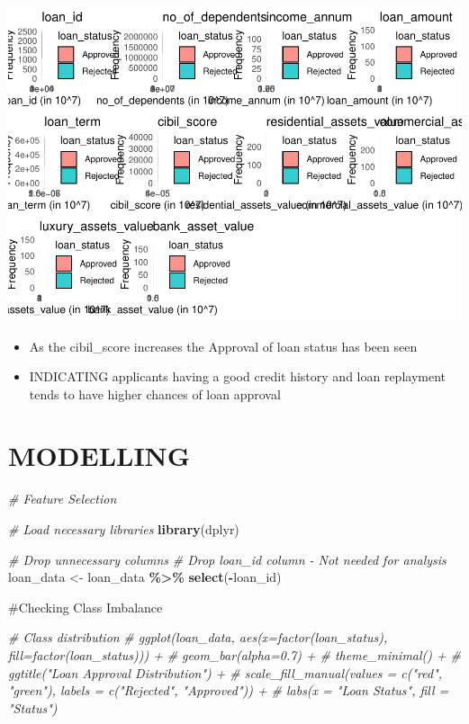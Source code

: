 \documentclass[
]{article}
\newenvironment{Shaded}{\begin{snugshade}}{\end{snugshade}}
\newcommand{\CommentTok}[1]{\textcolor[rgb]{0.56,0.35,0.01}{\textit{#1}}}
\newcommand{\FunctionTok}[1]{\textcolor[rgb]{0.13,0.29,0.53}{\textbf{#1}}}
\newcommand{\NormalTok}[1]{#1}
\newcommand{\OtherTok}[1]{\textcolor[rgb]{0.56,0.35,0.01}{#1}}
\newcommand{\SpecialCharTok}[1]{\textcolor[rgb]{0.81,0.36,0.00}{\textbf{#1}}}
\providecommand{\tightlist}{%
  \setlength{\itemsep}{0pt}\setlength{\parskip}{0pt}}
\begin{document}
\includegraphics{Loan_approval_files/figure-latex/unnamed-chunk-21-1.pdf}

\begin{itemize}
\tightlist
\item
  As the cibil\_score increases the Approval of loan status has been
  seen
\item
  INDICATING applicants having a good credit history and loan replayment
  tends to have higher chances of loan approval
\end{itemize}

\section{MODELLING}\label{modelling}

\begin{Shaded}
\begin{Highlighting}[]
\CommentTok{\# Feature Selection}

\CommentTok{\# Load necessary libraries}
\FunctionTok{library}\NormalTok{(dplyr)}

\CommentTok{\# Drop unnecessary columns}
\CommentTok{\# Drop \textquotesingle{}loan\_id\textquotesingle{} column {-} Not needed for analysis}
\NormalTok{loan\_data }\OtherTok{\textless{}{-}}\NormalTok{ loan\_data }\SpecialCharTok{\%\textgreater{}\%} \FunctionTok{select}\NormalTok{(}\SpecialCharTok{{-}}\NormalTok{loan\_id)}
\end{Highlighting}
\end{Shaded}

\#Checking Class Imbalance

\begin{Shaded}
\begin{Highlighting}[]
\CommentTok{\# Class distribution}
\CommentTok{\# ggplot(loan\_data, aes(x=factor(loan\_status), fill=factor(loan\_status))) + }
\CommentTok{\#   geom\_bar(alpha=0.7) + }
\CommentTok{\#   theme\_minimal() +}
\CommentTok{\#   ggtitle("Loan Approval Distribution") +}
\CommentTok{\#   scale\_fill\_manual(values = c("red", "green"), labels = c("Rejected", "Approved")) +}
\CommentTok{\#   labs(x = "Loan Status", fill = "Status")}
\end{Highlighting}
\end{Shaded}
\end{document}
